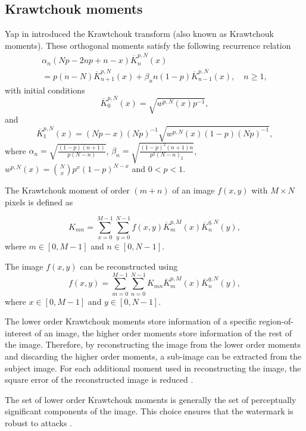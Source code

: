 \documentclass[runningheads]{llncs}
\begin{document}
\subsection{Krawtchouk moments}
Yap in \cite{Yap2003} introduced the Krawtchouk transform (also known as Krawtchouk moments). These orthogonal moments satisfy the following recurrence relation
\begin{multline*}
\alpha_n(Np-2np+n-x)\overline{K}_{n}^{p,N}(x) \\= p(n-N)\overline{K}_{n+1}^{p,N}(x)+\beta_n n(1-p)\overline{K}_{n-1}^{p,N}(x),\quad n\geq 1,
\end{multline*}
with initial conditions 
\begin{equation*}
\overline{K}_{0}^{p,N}(x) = \sqrt{w^{p,N}(x)p^{-1}},
\end{equation*}	
and
\begin{equation*}
\overline{K}_{1}^{p,N}(x) = (Np-x)(Np)^{-1}\sqrt{w^{p,N}(x)(1-p)(Np)^{-1}},
\end{equation*}
where $\alpha_n = \sqrt{\frac{(1-p)(n+1)}{p(N-n)}}$, $\beta_n = \sqrt{\frac{(1-p)^2(n+1)n}{p^2(N-n)_2}}$, $w^{p,N}(x) = \binom{N}{x}p^x(1-p)^{N-x}$ and $0<p<1$.

The Krawtchouk moment of order $(m+n)$ of an image $f(x,y)$ with $M\times N$ pixels is defined as

\begin{equation}
K_{mn}=\sum_{x=0}^{M-1}\sum_{y=0}^{N-1}f(x,y)\overline{K}_{m}^{p,M}(x)\overline{K}_{n}^{q,N}(y),
\label{DKT}
\end{equation}
where $m\in \left[ 0,M-1\right] $ and $n\in \left[ 0,N-1\right] $.

The image $f(x,y)$ can be reconstructed using
\begin{equation}
f(x,y)=\sum_{m=0}^{M-1}\sum_{n=0}^{N-1}K_{mn}\overline{K}_{m}^{p,M}(x)\overline{K}_{n}^{q,N}(y),
\label{IDKT}
\end{equation}
where $x\in \left[ 0,M-1\right] $ and $y\in \left[ 0,N-1\right] $.

The lower order Krawtchouk moments store information of a specific region-of-interest of an image, the higher order moments store information of the rest of the image. Therefore, by reconstructing the image from the lower order moments and discarding the higher order moments, a sub-image can be extracted from the subject image. For each additional moment used in reconstructing the image, the square error of the reconstructed image is reduced \cite{Yap2003}.

The set of lower order Krawtchouk moments is generally the set of perceptually significant components of the image. This choice ensures that the watermark is robust to attacks \cite{Yap2004}.
\end{document}
